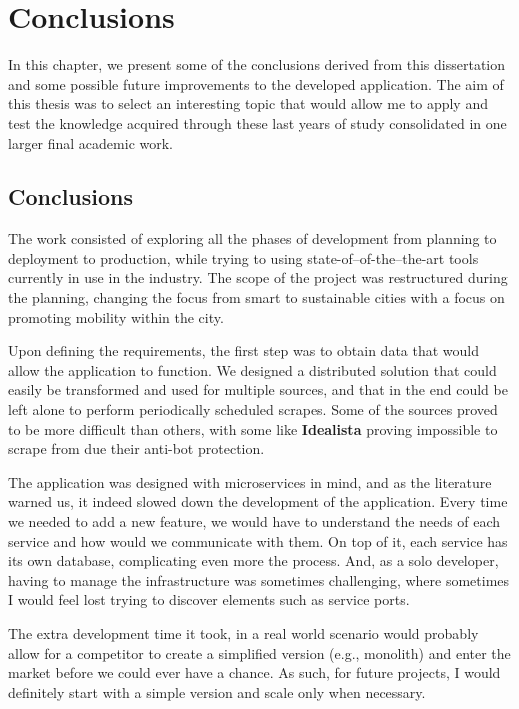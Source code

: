 \chapter{Conclusions}
\label{cha:conclusions}

In this chapter, we present some of the conclusions derived from this dissertation and some possible future improvements to the developed application. The aim of this thesis was to select an interesting topic that would allow me to apply and test the knowledge acquired through these last years of study consolidated in one larger final academic work.

\section{Conclusions}

The work consisted of exploring all the phases of development from planning to deployment to production, while trying to using state-of--of-the--the-art tools currently in use in the industry. The scope of the project was restructured during the planning, changing the focus from smart to sustainable cities with a focus on promoting mobility within the city.

Upon defining the requirements, the first step was to obtain data that would allow the application to function. We designed a distributed solution that could easily be transformed and used for multiple sources, and that in the end could be left alone to perform periodically scheduled scrapes. Some of the sources proved to be more difficult than others, with some like \textbf{Idealista} proving impossible to scrape from due their anti-bot protection.

The application was designed with microservices in mind, and as the literature warned us, it indeed slowed down the development of the application. Every time we needed to add a new feature, we would have to understand the needs of each service and how would we communicate with them. On top of it, each service has its own database, complicating even more the process. And, as a solo developer, having to manage the infrastructure was sometimes challenging, where sometimes I would feel lost trying to discover elements such as service ports.

The extra development time it took, in a real world scenario would probably allow for a competitor to create a simplified version (e.g., monolith) and enter the market before we could ever have a chance. As such, for future projects, I would definitely start with a simple version and scale only when necessary.

